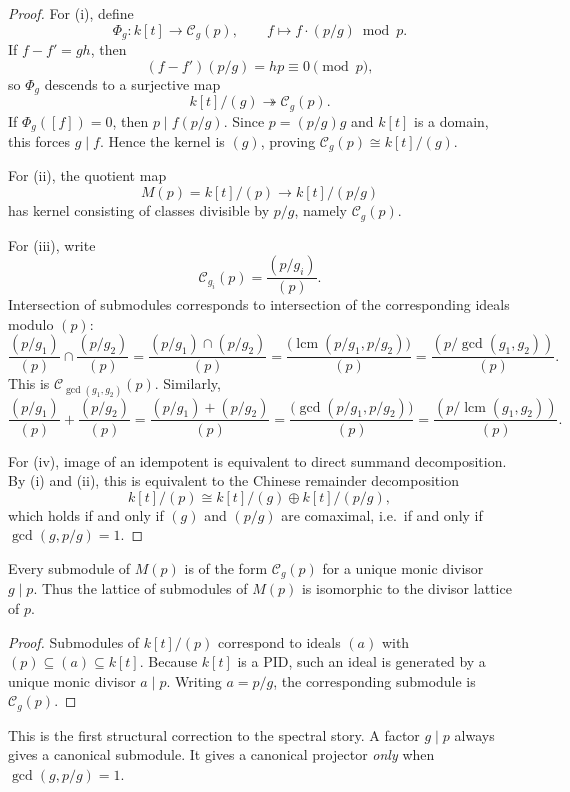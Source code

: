 \begin{proof}
For \textup{(i)}, define
\[
\Phi_g\colon k[t]\to \mathcal C_g(p),\qquad f\mapsto f\cdot (p/g)\bmod p.
\]
If \(f-f'=gh\), then
\[
(f-f')(p/g)=hp\equiv 0\pmod p,
\]
so \(\Phi_g\) descends to a surjective map
\[
k[t]/(g)\twoheadrightarrow \mathcal C_g(p).
\]
If \(\Phi_g([f])=0\), then \(p\mid f(p/g)\). Since \(p=(p/g)g\) and \(k[t]\) is a domain, this forces \(g\mid f\).
Hence the kernel is \((g)\), proving \(\mathcal C_g(p)\cong k[t]/(g)\).

For \textup{(ii)}, the quotient map
\[
M(p)=k[t]/(p)\longrightarrow k[t]/(p/g)
\]
has kernel consisting of classes divisible by \(p/g\), namely \(\mathcal C_g(p)\).

For \textup{(iii)}, write
\[
\mathcal C_{g_i}(p)=\frac{(p/g_i)}{(p)}.
\]
Intersection of submodules corresponds to intersection of the corresponding ideals modulo \((p)\):
\[
\frac{(p/g_1)}{(p)}\cap \frac{(p/g_2)}{(p)}
=\frac{(p/g_1)\cap (p/g_2)}{(p)}
=\frac{\bigl(\operatorname{lcm}(p/g_1,p/g_2)\bigr)}{(p)}
=\frac{(p/\gcd(g_1,g_2))}{(p)}.
\]
This is \(\mathcal C_{\gcd(g_1,g_2)}(p)\).
Similarly,
\[
\frac{(p/g_1)}{(p)}+\frac{(p/g_2)}{(p)}
=\frac{(p/g_1)+(p/g_2)}{(p)}
=\frac{\bigl(\gcd(p/g_1,p/g_2)\bigr)}{(p)}
=\frac{(p/\operatorname{lcm}(g_1,g_2))}{(p)}.
\]

For \textup{(iv)}, image of an idempotent is equivalent to direct summand decomposition.
By \textup{(i)} and \textup{(ii)}, this is equivalent to the Chinese remainder decomposition
\[
k[t]/(p)\cong k[t]/(g)\oplus k[t]/(p/g),
\]
which holds if and only if \((g)\) and \((p/g)\) are comaximal, i.e.\ if and only if \(\gcd(g,p/g)=1\).
\end{proof}

\begin{corollary}
Every submodule of \(M(p)\) is of the form \(\mathcal C_g(p)\) for a unique monic divisor \(g\mid p\).
Thus the lattice of submodules of \(M(p)\) is isomorphic to the divisor lattice of \(p\).
\end{corollary}

\begin{proof}
Submodules of \(k[t]/(p)\) correspond to ideals \((a)\) with \((p)\subseteq (a)\subseteq k[t]\).
Because \(k[t]\) is a PID, such an ideal is generated by a unique monic divisor \(a\mid p\).
Writing \(a=p/g\), the corresponding submodule is \(\mathcal C_g(p)\).
\end{proof}

\begin{remark}
This is the first structural correction to the spectral story.
A factor \(g\mid p\) always gives a canonical submodule.
It gives a canonical projector \emph{only} when \(\gcd(g,p/g)=1\).
\end{remark}

